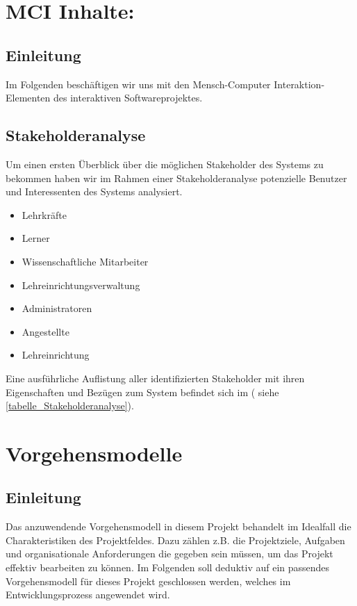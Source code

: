 \section{MCI Inhalte:}
\label{sec:MCI Inhalte}

\subsection{Einleitung}
\label{sec:Einleitung}

Im Folgenden beschäftigen wir uns mit den Mensch-Computer Interaktion-Elementen
des interaktiven Softwareprojektes.

\subsection{Stakeholderanalyse}
\label{sec:Stakeholderanalyse}

Um einen ersten Überblick über die möglichen Stakeholder des Systems zu bekommen
haben wir im Rahmen einer Stakeholderanalyse potenzielle Benutzer und 
Interessenten des Systems analysiert. 
\begin{itemize}
	\item Lehrkräfte
	\item Lerner
	\item Wissenschaftliche Mitarbeiter
	\item Lehreinrichtungsverwaltung
	\item Administratoren
	\item Angestellte
	\item Lehreinrichtung
\end{itemize}

Eine ausführliche Auflistung aller identifizierten Stakeholder mit ihren
Eigenschaften und Bezügen zum System befindet sich im ( siehe \ref{tabelle_Stakeholderanalyse}).

\section{Vorgehensmodelle}
\label{sec:Vorgehensmodelle}

\subsection{Einleitung}
\label{sec:Vorgehensmodelle Einleitung}

Das anzuwendende Vorgehensmodell in diesem Projekt behandelt im Idealfall
die Charakteristiken des Projektfeldes. Dazu zählen z.B. die Projektziele,
Aufgaben und organisationale Anforderungen die gegeben sein müssen, um das
Projekt effektiv bearbeiten zu können. Im Folgenden soll deduktiv auf ein
passendes Vorgehensmodell für dieses Projekt geschlossen werden, welches im
Entwicklungsprozess angewendet wird.

